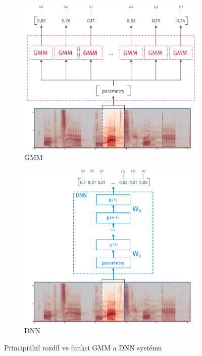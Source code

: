 \begin{figure}[htpb]
  \centering
  \begin{subfigure}[b]{0.4\textwidth}
    \includegraphics[width=\textwidth]{./ch4-asr/img/hmm-gmm.pdf}
    \caption{GMM}
    \label{fig:asr:acoustic:dnn:asr:diff:dnn}
  \end{subfigure}
  \begin{subfigure}[b]{0.4\textwidth}
    \includegraphics[width=\textwidth]{./ch4-asr/img/hmm-dnn.pdf}
    \caption{DNN}
    \label{fig:asr:acoustic:dnn:asr:diff:dnn}
  \end{subfigure}
  \caption{Principiální rozdíl ve funkci GMM a DNN systému}
  \label{fig:asr:acoustic:dnn:asr:diff}
\end{figure}

